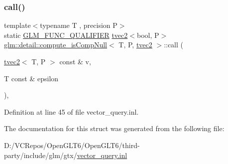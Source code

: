 \subsubsection{\texorpdfstring{call()}{call()}}
{\footnotesize\ttfamily template$<$typename T , precision P$>$ \\
static \mbox{\hyperlink{setup_8hpp_a33fdea6f91c5f834105f7415e2a64407}{G\+L\+M\+\_\+\+F\+U\+N\+C\+\_\+\+Q\+U\+A\+L\+I\+F\+I\+ER}} \mbox{\hyperlink{structglm_1_1tvec2}{tvec2}}$<$bool, P$>$ \mbox{\hyperlink{structglm_1_1detail_1_1compute__is_comp_null}{glm\+::detail\+::compute\+\_\+is\+Comp\+Null}}$<$ T, P, \mbox{\hyperlink{structglm_1_1tvec2}{tvec2}} $>$\+::call (\begin{DoxyParamCaption}\item[{\mbox{\hyperlink{structglm_1_1tvec2}{tvec2}}$<$ T, P $>$ const \&}]{v,  }\item[{T const \&}]{epsilon }\end{DoxyParamCaption})\hspace{0.3cm}{\ttfamily [inline]}, {\ttfamily [static]}}



Definition at line 45 of file vector\+\_\+query.\+inl.



The documentation for this struct was generated from the following file\+:\begin{DoxyCompactItemize}
\item 
D\+:/\+V\+C\+Repos/\+Open\+G\+L\+T6/\+Open\+G\+L\+T6/third-\/party/include/glm/gtx/\mbox{\hyperlink{vector__query_8inl}{vector\+\_\+query.\+inl}}\end{DoxyCompactItemize}
